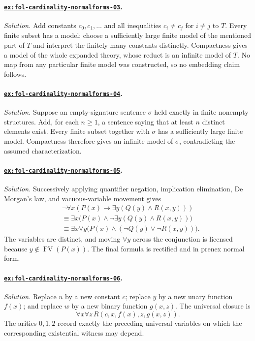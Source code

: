 \documentclass[11pt,oneside,openany]{book}
\theoremstyle{definition}
\theoremstyle{plain}
\theoremstyle{remark}
\newcommand{\FV}{\operatorname{FV}}
\begin{document}
\paragraph{\hyperref[ex:fol-cardinality-normalforms-03]{\texttt{ex:fol-cardinality-normalforms-03}}.}
\textit{Solution.}  Add constants \(c_0,c_1,\ldots\) and all inequalities
\(c_i\ne c_j\) for \(i\ne j\) to \(T\).  Every finite subset has a model:
choose a sufficiently large finite model of the mentioned part of \(T\) and
interpret the finitely many constants distinctly.  Compactness gives a model
of the whole expanded theory, whose reduct is an infinite model of \(T\).  No
map from any particular finite model was constructed, so no embedding claim
follows.

\paragraph{\hyperref[ex:fol-cardinality-normalforms-04]{\texttt{ex:fol-cardinality-normalforms-04}}.}
\textit{Solution.}  Suppose an empty-signature sentence \(\sigma\) held exactly
in finite nonempty structures.  Add, for each \(n\geq1\), a sentence saying
that at least \(n\) distinct elements exist.  Every finite subset together with
\(\sigma\) has a sufficiently large finite model.  Compactness therefore gives
an infinite model of \(\sigma\), contradicting the assumed characterization.

\paragraph{\hyperref[ex:fol-cardinality-normalforms-05]{\texttt{ex:fol-cardinality-normalforms-05}}.}
\textit{Solution.}  Successively applying quantifier negation, implication
elimination, De Morgan's law, and vacuous-variable movement gives
\[
\begin{aligned}
&\neg\forall x(P(x)\to\exists y(Q(y)\land R(x,y)))\\
&\equiv\exists x\bigl(P(x)\land\neg\exists y(Q(y)\land R(x,y))\bigr)\\
&\equiv\exists x\forall y
  \bigl(P(x)\land(\neg Q(y)\lor\neg R(x,y))\bigr).
\end{aligned}
\]
The variables are distinct, and moving \(\forall y\) across the conjunction is
licensed because \(y\notin\FV(P(x))\).  The final formula is rectified and in
prenex normal form.

\paragraph{\hyperref[ex:fol-cardinality-normalforms-06]{\texttt{ex:fol-cardinality-normalforms-06}}.}
\textit{Solution.}  Replace \(u\) by a new constant \(c\); replace \(y\) by a
new unary function \(f(x)\); and replace \(w\) by a new binary function
\(g(x,z)\).  The universal closure is
\[
\forall x\forall z\,R(c,x,f(x),z,g(x,z)).
\]
The arities \(0,1,2\) record exactly the preceding universal variables on which
the corresponding existential witness may depend.
\end{document}
